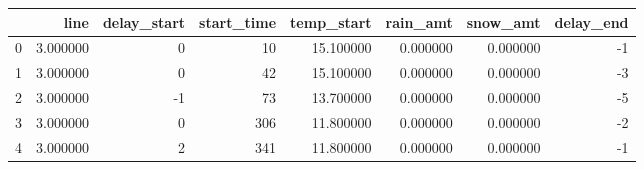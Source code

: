 \begin{tabular}{lrrrrrrr}
\toprule
 & line & delay_start & start_time & temp_start & rain_amt & snow_amt & delay_end \\
\midrule
0 & 3.000000 & 0 & 10 & 15.100000 & 0.000000 & 0.000000 & -1 \\
1 & 3.000000 & 0 & 42 & 15.100000 & 0.000000 & 0.000000 & -3 \\
2 & 3.000000 & -1 & 73 & 13.700000 & 0.000000 & 0.000000 & -5 \\
3 & 3.000000 & 0 & 306 & 11.800000 & 0.000000 & 0.000000 & -2 \\
4 & 3.000000 & 2 & 341 & 11.800000 & 0.000000 & 0.000000 & -1 \\
\bottomrule
\end{tabular}

